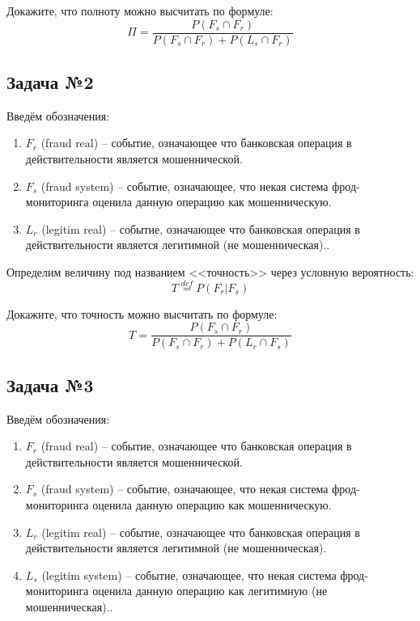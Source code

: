 \documentclass[english,russian,12pt]{article}
\begin{document}
Докажите, что полноту можно высчитать по формуле:
\begin{equation}
\Pi = \frac{P(F_s \cap F_r)}{P(F_s \cap F_r) + P(L_s \cap F_r)}
\end{equation}


\subsection*{Задача №2}
Введём обозначения:
\begin{enumerate}
	\item $F_r$ (fraud real) -- событие, означающее что банковская операция в действительности является мошеннической. 
	\item $F_s$ (fraud system) -- событие, означающее, что некая система фрод-мониторинга оценила данную операцию как мошенническую.
	\item $L_r$ (legitim real) -- событие, означающее что банковская операция в действительности является легитимной (не мошенническая).. 
\end{enumerate}

Определим величину под названием <<точность>> через условную вероятность:
\begin{equation}
T \stackrel{def}{=} P(F_r | F_s)
\end{equation}

Докажите, что точность можно высчитать по формуле:
\begin{equation}
T = \frac{P(F_s \cap F_r)}{P(F_s \cap F_r) + P(L_r \cap F_s)}
\end{equation}


\subsection*{Задача №3}
Введём обозначения:
\begin{enumerate}
	\item $F_r$ (fraud real) -- событие, означающее что банковская операция в действительности является мошеннической. 
	\item $F_s$ (fraud system) -- событие, означающее, что некая система фрод-мониторинга оценила данную операцию как мошенническую.
	\item $L_r$ (legitim real) -- событие, означающее что банковская операция в действительности является легитимной (не мошенническая).
 	\item $L_s$ (legitim system) -- событие, означающее, что некая система фрод-мониторинга оценила данную операцию как легитимную (не мошенническая).. 
\end{enumerate}
\end{document}

